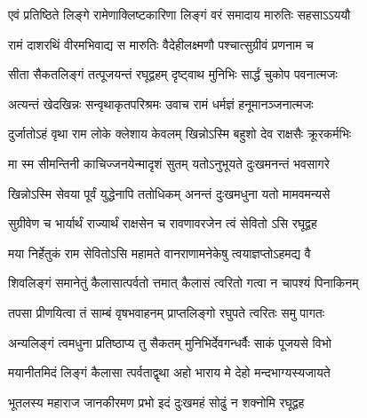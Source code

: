 
\vakta{}
\shrota{}
\tags{}
\notes{}

\storymeta





\twolineshloka
{एवं प्रतिष्ठिते लिङ्गे रामेणाक्लिष्टकारिणा}
{लिङ्गं वरं समादाय मारुतिः सहसाऽऽययौ}%

\twolineshloka
{रामं दाशरथिं वीरमभिवाद्य स मारुतिः}
{वैदेहीलक्ष्मणौ पश्चात्सुग्रीवं प्रणनाम च}%

\twolineshloka
{सीता सैकतलिङ्गं तत्पूजयन्तं रघूद्वहम्}
{दृष्ट्वाथ मुनिभिः सार्द्धं चुकोप पवनात्मजः}%

\twolineshloka
{अत्यन्तं खेदखिन्नः सन्वृथाकृतपरिश्रमः}
{उवाच रामं धर्मज्ञं हनूमानञ्जनात्मजः}%


\twolineshloka
{दुर्जातोऽहं वृथा राम लोके क्लेशाय केवलम्}
{खिन्नोऽस्मि बहुशो देव राक्षसैः क्रूरकर्मभिः}%

\twolineshloka
{मा स्म सीमन्तिनी काचिज्जनयेन्मादृशं सुतम्}
{यतोऽनुभूयते दुःखमनन्तं भवसागरे}%

\twolineshloka
{खिन्नोऽस्मि सेवया पूर्वं युद्धेनापि ततोधिकम्}
{अनन्तं दुःखमधुना यतो मामवमन्यसे}%

\twolineshloka
{सुग्रीवेण च भार्यार्थं राज्यार्थं राक्षसेन च}
{रावणावरजेन त्वं सेवितो ऽसि रघूद्वह}%

\twolineshloka
{मया निर्हेतुकं राम सेवितोऽसि महामते}
{वानराणामनेकेषु त्वयाज्ञप्तोऽहमद्य वै}%

\twolineshloka
{शिवलिङ्गं समानेतुं कैलासात्पर्वतो त्तमात्}
{कैलासं त्वरितो गत्वा न चापश्यं पिनाकिनम्}%

\twolineshloka
{तपसा प्रीणयित्वा तं साम्बं वृषभवाहनम्}
{प्राप्तलिङ्गो रघुपते त्वरितः समु पागतः}%

\twolineshloka
{अन्यलिङ्गं त्वमधुना प्रतिष्ठाप्य तु सैकतम्}
{मुनिभिर्देवगन्धर्वैः साकं पूजयसे विभो}%

\twolineshloka
{मयानीतमिदं लिङ्गं कैलासा त्पर्वताद्वृथा}
{अहो भाराय मे देहो मन्दभाग्यस्यजायते}%

\twolineshloka
{भूतलस्य महाराज जानकीरमण प्रभो}
{इदं दुःखमहं सोढुं न शक्नोमि रघूद्वह}%

